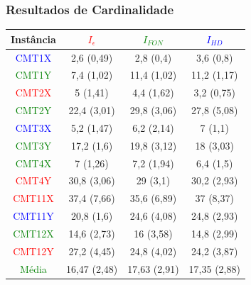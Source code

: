 \documentclass{beamer}
\begin{document}
\begin{frame}
  \frametitle{Resultados de Cardinalidade}
    \footnotesize{
    \begin{tabular}{c|ccc}
\hline
Instância & \textcolor{red}{$I_{\epsilon}$}             & \textcolor{green}{$I_{FON}$}             & \textcolor{blue}{ $I_{HD}$}      \\
\hline
\textcolor{blue}{ CMT1X}     & 2,6 (0,49)  & 2,8 (0,4)   & 3,6 (0,8)   \\
\textcolor{green}{CMT1Y}     & 7,4 (1,02)  & 11,4 (1,02) & 11,2 (1,17) \\
\textcolor{red}{CMT2X}     & 5 (1,41)    & 4,4 (1,62)  & 3,2 (0,75)  \\
\textcolor{green}{CMT2Y}     & 22,4 (3,01) & 29,8 (3,06) & 27,8 (5,08) \\
\textcolor{blue}{ CMT3X}     & 5,2 (1,47)  & 6,2 (2,14)  & 7 (1,1)     \\
\textcolor{green}{CMT3Y}     & 17,2 (1,6)  & 19,8 (3,12) & 18 (3,03)   \\
\textcolor{green}{CMT4X}     & 7 (1,26)    & 7,2 (1,94)  & 6,4 (1,5)   \\
\textcolor{red}{CMT4Y}     & 30,8 (3,06) & 29 (3,1)    & 30,2 (2,93) \\
\textcolor{red}{CMT11X}    & 37,4 (7,66) & 35,6 (6,89) & 37 (8,37)   \\
\textcolor{blue}{CMT11Y}    & 20,8 (1,6)  & 24,6 (4,08) & 24,8 (2,93) \\
\textcolor{green}{CMT12X}    & 14,6 (2,73) & 16 (3,58)   & 14,8 (2,99) \\
\textcolor{red}{CMT12Y}    & 27,2 (4,45) & 24,8 (4,02) & 24,2 (3,87) \\
\hline
\textcolor{green}{Média}& 16,47 (2,48)& 17,63 (2,91)& 17,35 (2,88)\\
\hline
\end{tabular}
  }
\end{frame}
\end{document}

